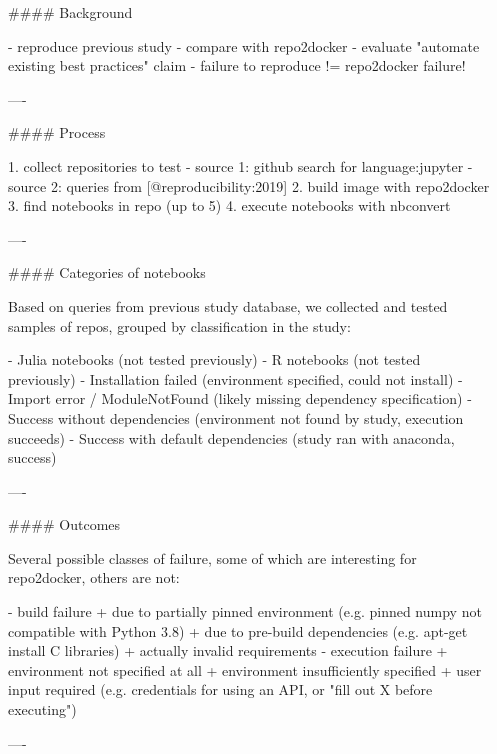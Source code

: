 \documentclass{beamer}
\begin{document}
\begin{frame}[fragile]
\begin{columns}[T]
\begin{column}{.46\textwidth}
\begin{markdown}

#### Background

- reproduce previous study
- compare with repo2docker
- evaluate "automate existing best practices" claim
- failure to reproduce != repo2docker failure!

----


#### Process

1. collect repositories to test
    - source 1: github search for language:jupyter
    - source 2: queries from [@reproducibility:2019]
2. build image with repo2docker
3. find notebooks in repo (up to 5)
4. execute notebooks with nbconvert


----

#### Categories of notebooks

Based on queries from previous study database, we collected and tested samples of repos,
grouped by classification in the study:

- Julia notebooks (not tested previously)
- R notebooks (not tested previously)
- Installation failed (environment specified, could not install)
- Import error / ModuleNotFound (likely missing dependency specification)
- Success without dependencies (environment not found by study, execution succeeds)
- Success with default dependencies (study ran with anaconda, success)

----

#### Outcomes

Several possible classes of failure,
some of which are interesting for repo2docker,
others are not:

- build failure
    + due to partially pinned environment (e.g. pinned numpy not compatible with Python 3.8)
    + due to pre-build dependencies (e.g. apt-get install C libraries)
    + actually invalid requirements
- execution failure
    + environment not specified at all
    + environment insufficiently specified
    + user input required (e.g. credentials for using an API, or "fill out X before executing")

----


\end{markdown}

\end{column}

\begin{column}{.46\textwidth}

\begin{markdown}




\end{markdown}
\end{column}
\end{columns}
\end{frame}
\end{document}

